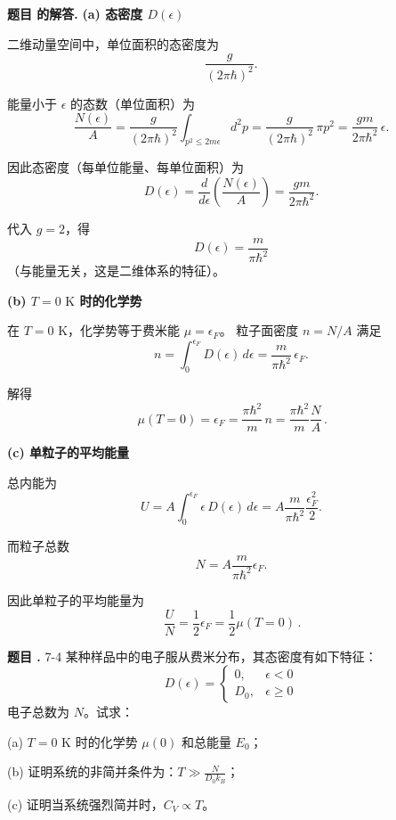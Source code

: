 \documentclass[12pt, a4paper, oneside]{ctexart}
\newcounter{problemname}
\newenvironment{problem}
  {\begin{shaded}\stepcounter{problemname}\par\noindent\textbf{题目 \theproblemname. }}
  {\end{shaded}\par}
\newenvironment{solution}
  {\par\noindent\textbf{题目 \theproblemname 的解答. }}
  {\par}
\begin{document}
\begin{solution}
  \textbf{(a) 态密度 $D(\epsilon)$}

二维动量空间中，单位面积的态密度为
\[
\frac{g}{(2\pi\hbar)^2}.
\]

能量小于 $\epsilon$ 的态数（单位面积）为
\[
\frac{N(\epsilon)}{A}
= \frac{g}{(2\pi\hbar)^2}\int_{p^2\le 2m\epsilon} d^2p
= \frac{g}{(2\pi\hbar)^2}\,\pi p^2
= \frac{g m}{2\pi\hbar^2}\,\epsilon.
\]

因此态密度（每单位能量、每单位面积）为
\[
D(\epsilon)=\frac{d}{d\epsilon}\!\left(\frac{N(\epsilon)}{A}\right)
= \frac{g m}{2\pi\hbar^2}.
\]

代入 $g=2$，得
\[
\boxed{\,D(\epsilon)=\frac{m}{\pi\hbar^2}\,}
\]
（与能量无关，这是二维体系的特征）。

\textbf{(b) $T=0\text{ K}$ 时的化学势}

在 $T=0$ K，化学势等于费米能 $\mu=\epsilon_F$。
粒子面密度 $n=N/A$ 满足
\[
n=\int_0^{\epsilon_F} D(\epsilon)\,d\epsilon
= \frac{m}{\pi\hbar^2}\,\epsilon_F.
\]

解得
\[
\boxed{\,\mu(T=0)=\epsilon_F=\frac{\pi\hbar^2}{m}\,n
=\frac{\pi\hbar^2}{m}\frac{N}{A}\, }.
\]

\textbf{(c) 单粒子的平均能量}

总内能为
\[
U = A\int_0^{\epsilon_F}\epsilon\,D(\epsilon)\,d\epsilon
= A\frac{m}{\pi\hbar^2}\frac{\epsilon_F^2}{2}.
\]

而粒子总数
\[
N=A\frac{m}{\pi\hbar^2}\epsilon_F.
\]

因此单粒子的平均能量为
\[
\boxed{\,\frac{U}{N}=\frac{1}{2}\epsilon_F
=\frac{1}{2}\mu(T=0)\, }.
\]
\end{solution}

\begin{problem}{7-4}
  某种样品中的电子服从费米分布，其态密度有如下特征：
$$D(\epsilon) = \begin{cases} 0, & \epsilon < 0 \\ D_0, & \epsilon \ge 0 \end{cases}$$
电子总数为 $N$。试求：

(a) $T = 0\text{ K}$ 时的化学势 $\mu(0)$ 和总能量 $E_0$；

(b) 证明系统的非简并条件为：$T \gg \frac{N}{D_0 k_B}$；

(c) 证明当系统强烈简并时，$C_V \propto T$。
\end{problem}
\end{document}
